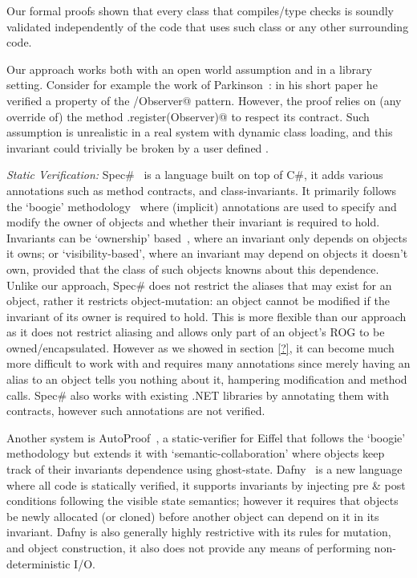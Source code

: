 Our formal proofs shown that every class that compiles/type checks is soundly validated independently of the code that uses such class or any other surrounding code.

Our approach works both with an open world assumption and in a library setting.
Consider for example the work of Parkinson~\cite{parkinson2007class}: in his short paper he verified a property of the \Q@Subject/Observer@ pattern. However, the proof relies on (any override of) the method \Q@Subject.register(Observer)@ to respect its contract. Such assumption is unrealistic in a real system with dynamic class loading, and this invariant could trivially be broken by a user defined \Q@EvilSubject@.

\textit{Static Verification:}
Spec\#~\cite{?} is a language built on top of C\#, it adds various annotations such as method contracts, and class-invariants. 
It primarily follows the `boogie' methodology~\cite{?} where (implicit) annotations are used to specify and modify the owner of objects and whether their invariant is required to hold. Invariants can be `ownership' based~\cite{?}, where an invariant only depends on objects it owns; or `visibility-based', where an invariant may depend on objects it doesn't own, provided that the class of such objects knowns about this dependence. Unlike our approach, Spec\# does not restrict the aliases that may exist for an object, rather it restricts object-mutation: an object cannot be modified if the invariant of its owner is required to hold. This is more flexible than our approach as it does not restrict aliasing and allows only part of an object's ROG to be owned/encapsulated. However as we showed in section \ref{?}, it can become much more difficult to work with and requires many annotations since merely having an alias to an object tells you nothing about it, hampering modification and method calls. Spec\# also works with existing .NET libraries by annotating them with contracts, however such annotations are not verified.	

Another system is AutoProof~\cite{?}, a static-verifier for Eiffel that follows the `boogie' methodology but extends it with `semantic-collaboration' where objects keep track of their invariants dependence using ghost-state.
Dafny~\cite{?} is a new language where all code is statically verified, it supports invariants by injecting pre \& post conditions following the visible state semantics;
however it requires that objects be newly allocated (or cloned) before another object can depend on it in its  invariant.
Dafny is also generally highly restrictive with its rules for mutation, and object construction, it also does not provide any means of performing non-deterministic I/O.



